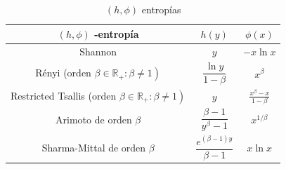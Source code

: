 \documentclass[11pt]{article}
\begin{document}
\begin{table}[htb]
	\caption{\label{entropia} $(h,\phi)$ entropías}
	\centering
	\renewcommand*{\arraystretch}{2}
	\begin{tabular}{ccc} 
		\toprule
		$(h, \phi)$ -entropía & $h(y)$ & $\phi(x)$ \\
		\midrule 
		Shannon  & $y$ & $-x \ln x$ \\
		Rényi (orden $\left.\beta \in \mathbb{R}_{+}: \beta \neq 1\right)$ & $\dfrac{\ln y}{1-\beta}$ & $x^{\beta}$ \\
		Restricted Tsallis (orden $\left.\beta \in \mathbb{R}_{+}: \beta \neq 1\right)$ & $y$ & $\frac{x^{\beta}-x}{1-\beta}$ \\ 
		Arimoto de orden $\beta$ & $\dfrac{\beta-1}{y^{\beta}-1}$ & $x^{1 / \beta}$ \\ \addlinespace
		Sharma-Mittal de orden $\beta$ & $\dfrac{e^{(\beta-1) y}}{\beta-1}$ & $x \ln x$ \\
		\bottomrule
	\end{tabular}
\end{table}


\end{document}
